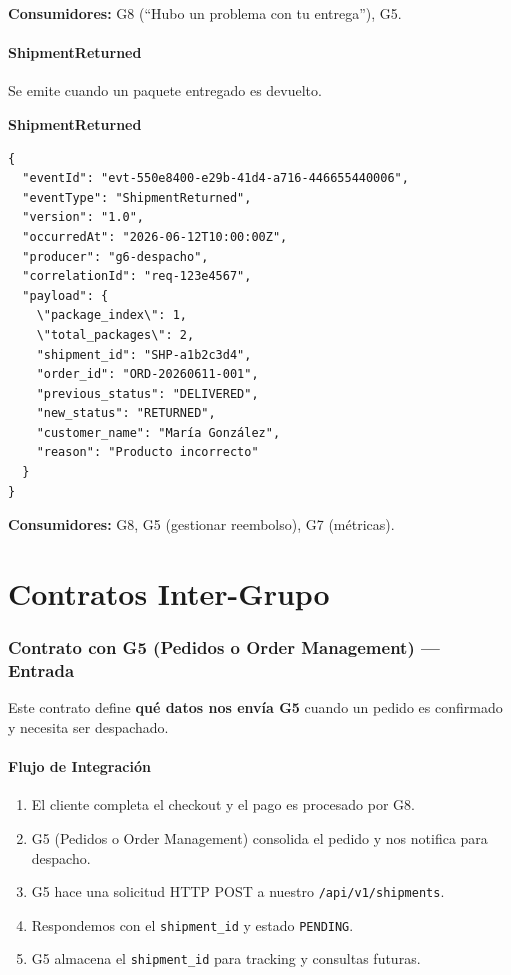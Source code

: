\documentclass[11pt, a4paper]{article}
\newcommand{\contractheader}[1]{%
  \noindent\colorbox{primary!10}{%
    \parbox{\dimexpr\textwidth-2\fboxsep}{%
      \textbf{\faFileCode\quad #1}%
    }%
  }
  \vspace{0.3cm}
}
\begin{document}
\textbf{Consumidores:} G8 (``Hubo un problema con tu entrega''), G5.

\vspace{0.4cm}

\subsection{ShipmentReturned}

Se emite cuando un paquete entregado es devuelto.

\contractheader{ShipmentReturned}

\begin{lstlisting}
{
  "eventId": "evt-550e8400-e29b-41d4-a716-446655440006",
  "eventType": "ShipmentReturned",
  "version": "1.0",
  "occurredAt": "2026-06-12T10:00:00Z",
  "producer": "g6-despacho",
  "correlationId": "req-123e4567",
  "payload": {
    \"package_index\": 1,
    \"total_packages\": 2,
    "shipment_id": "SHP-a1b2c3d4",
    "order_id": "ORD-20260611-001",
    "previous_status": "DELIVERED",
    "new_status": "RETURNED",
    "customer_name": "María González",
    "reason": "Producto incorrecto"
  }
}
\end{lstlisting}

\textbf{Consumidores:} G8, G5 (gestionar reembolso), G7 (métricas).


\newpage
\part{Contratos Inter-Grupo}

\section{Contrato con G5 (Pedidos o Order Management) --- Entrada}
\label{sec:contrato-g5}

Este contrato define \textbf{qué datos nos envía G5} cuando un pedido es
confirmado y necesita ser despachado.

\subsection{Flujo de Integración}

\begin{enumerate}[noitemsep]
  \item El cliente completa el checkout y el pago es procesado por G8.
  \item G5 (Pedidos o Order Management) consolida el pedido y nos notifica para despacho.
  \item G5 hace una solicitud HTTP POST a nuestro \texttt{/api/v1/shipments}.
  \item Respondemos con el \texttt{shipment\_id} y estado \texttt{PENDING}.
  \item G5 almacena el \texttt{shipment\_id} para tracking y consultas futuras.
\end{enumerate}
\end{document}
